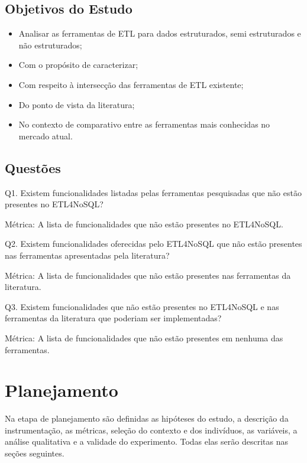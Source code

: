 \subsection{Objetivos do Estudo}

\begin{itemize}
	\item Analisar as ferramentas de ETL para dados estruturados, semi estruturados e não estruturados;
	
	\item Com o propósito de caracterizar;
	
	\item Com respeito à intersecção das ferramentas de ETL existente;
	
	\item Do ponto de vista da literatura;
	
	\item No contexto de comparativo entre as ferramentas mais conhecidas no mercado atual.
\end{itemize}


\subsection{Questões}

Q1. Existem funcionalidades listadas pelas ferramentas pesquisadas que não estão presentes no ETL4NoSQL?

Métrica: A lista de funcionalidades que não estão presentes no ETL4NoSQL.

Q2. Existem funcionalidades oferecidas pelo ETL4NoSQL que não estão presentes nas ferramentas apresentadas pela literatura?

Métrica: A lista de funcionalidades que não estão presentes nas ferramentas da literatura.

Q3. Existem funcionalidades que não estão presentes no ETL4NoSQL e nas ferramentas da literatura que poderiam ser implementadas?

Métrica: A lista de funcionalidades que não estão presentes em nenhuma das ferramentas.

\section{Planejamento}

Na etapa de planejamento são definidas as hipóteses do estudo, a descrição da instrumentação, as métricas, seleção do contexto e dos indivíduos, as variáveis, a análise qualitativa e a validade do experimento. Todas elas serão descritas nas seções seguintes.

